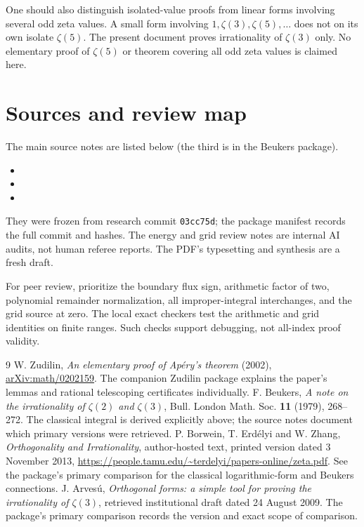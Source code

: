 \documentclass[11pt]{article}
\begin{document}
One should also distinguish isolated-value proofs from linear forms involving several odd zeta values. A small form involving $1,\zeta(3),\zeta(5),\ldots$ does not on its own isolate $\zeta(5)$. The present document proves irrationality of $\zeta(3)$ only. No elementary proof of $\zeta(5)$ or theorem covering all odd zeta values is claimed here.

\section*{Sources and review map}
The main source notes are listed below (the third is in the Beukers package).
\begin{itemize}
\item {}
\item {}
\item {}
\end{itemize}
 They were frozen from research commit \texttt{03cc75d}; the package manifest records the full commit and hashes. The energy and grid review notes are internal AI audits, not human referee reports. The PDF's typesetting and synthesis are a fresh draft.

For peer review, prioritize the boundary flux sign, arithmetic factor of two, polynomial remainder normalization, all improper-integral interchanges, and the grid source at zero. The local exact checkers test the arithmetic and grid identities on finite ranges. Such checks support debugging, not all-index proof validity.

\begin{thebibliography}{9}
 W. Zudilin, \emph{An elementary proof of Ap\'ery's theorem} (2002), \href{https://arxiv.org/abs/math/0202159}{arXiv:math/0202159}. The companion Zudilin package explains the paper's lemmas and rational telescoping certificates individually.
 F. Beukers, \emph{A note on the irrationality of $\zeta(2)$ and $\zeta(3)$}, Bull. London Math. Soc. \textbf{11} (1979), 268--272. The classical integral is derived explicitly above; the source notes document which primary versions were retrieved.
 P. Borwein, T. Erd\'elyi and W. Zhang, \emph{Orthogonality and Irrationality}, author-hosted text, printed version dated 3 November 2013, \url{https://people.tamu.edu/~terdelyi/papers-online/zeta.pdf}. See the package's primary comparison for the classical logarithmic-form and Beukers connections.
 J. Arves\'u, \emph{Orthogonal forms: a simple tool for proving the irrationality of $\zeta(3)$}, retrieved institutional draft dated 24 August 2009. The package's primary comparison records the version and exact scope of comparison.
\end{thebibliography}
\end{document}
